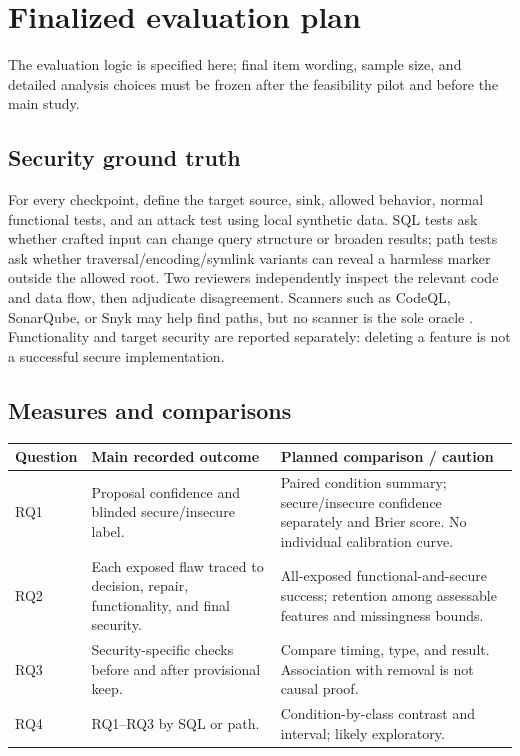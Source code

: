 \documentclass[12pt,a4paper]{article}
\renewcommand{\arraystretch}{1.12}
\begin{document}
\section{Finalized evaluation plan}
The evaluation logic is specified here; final item wording, sample size, and detailed analysis choices must be frozen after the feasibility pilot and before the main study.

\subsection{Security ground truth}
For every checkpoint, define the target source, sink, allowed behavior, normal functional tests, and an attack test using local synthetic data. SQL tests ask whether crafted input can change query structure or broaden results; path tests ask whether traversal/encoding/symlink variants can reveal a harmless marker outside the allowed root. Two reviewers independently inspect the relevant code and data flow, then adjudicate disagreement. Scanners such as CodeQL, SonarQube, or Snyk may help find paths, but no scanner is the sole oracle \cite{owasp,codeqlsql,codeqlpath}. Functionality and target security are reported separately: deleting a feature is not a successful secure implementation.

\subsection{Measures and comparisons}
\begingroup
\renewcommand{\arraystretch}{1.03}
\begin{tabularx}{\textwidth}{@{}p{}p{}X@{}}
\toprule
Question & Main recorded outcome & Planned comparison / caution\\
\midrule
RQ1 & Proposal confidence and blinded secure/insecure label. & Paired condition summary; secure/insecure confidence separately and Brier score. No individual calibration curve.\\
RQ2 & Each exposed flaw traced to decision, repair, functionality, and final security. & All-exposed functional-and-secure success; retention among assessable features and missingness bounds.\\
RQ3 & Security-specific checks before and after provisional keep. & Compare timing, type, and result. Association with removal is not causal proof.\\
RQ4 & RQ1--RQ3 by SQL or path. & Condition-by-class contrast and interval; likely exploratory.\\
\bottomrule
\end{tabularx}
\endgroup
\end{document}
